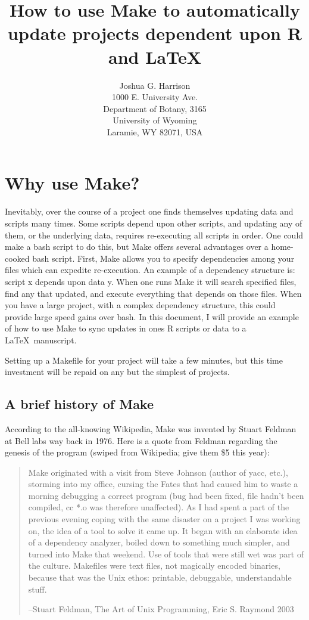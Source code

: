 \documentclass{article}
\title{How to use {\sf Make} to automatically update projects dependent upon {\sf R} and \LaTeX}
\author{
    Joshua G. Harrison\\
    1000 E. University Ave.\\
    Department of Botany, 3165\\
    University of Wyoming\\
    Laramie, WY 82071, USA\\
}
\begin{document}
\maketitle

\section{Why use {\sf Make}?}

Inevitably, over the course of a project one finds themselves updating data and scripts many times. Some scripts depend upon other scripts, and updating any of them, or the underlying data, requires re-executing all scripts in order. One could make a {\sf bash} script to do this, but {\sf Make} offers several advantages over a home-cooked {\sf bash} script. First, {\sf Make} allows you to specify dependencies among your files which can expedite re-execution. An example of a dependency structure is: script x depends upon data y. When one runs {\sf Make} it will search specified files, find any that updated, and execute everything that depends on those files. When you have a large project, with a complex dependency structure, this could provide large speed gains over {\sf bash}.  
In this document, I will provide an example of how to use {\sf Make} to sync updates in ones R scripts or data to a \LaTeX\ manuscript. 

Setting up a Makefile for your project will take a few minutes, but this time investment will be repaid on any but the simplest of projects.

\subsection{A brief history of {\sf Make} }

According to the all-knowing Wikipedia, {\sf Make} was invented by Stuart Feldman at Bell labs way back in 1976. Here is a quote from Feldman regarding the genesis of the program (swiped from Wikipedia; give them \$5 this year):

    \begin{quote}
        Make originated with a visit from Steve Johnson (author of yacc, etc.), storming into my office, cursing the Fates that had caused him to waste a morning debugging a correct program (bug had been fixed, file hadn't been compiled, cc *.o was therefore unaffected). As I had spent a part of the previous evening coping with the same disaster on a project I was working on, the idea of a tool to solve it came up. It began with an elaborate idea of a dependency analyzer, boiled down to something much simpler, and turned into Make that weekend. Use of tools that were still wet was part of the culture. Makefiles were text files, not magically encoded binaries, because that was the Unix ethos: printable, debuggable, understandable stuff.
        
        --Stuart Feldman, The Art of Unix Programming, Eric S. Raymond 2003
    \end{quote}
\end{document}
